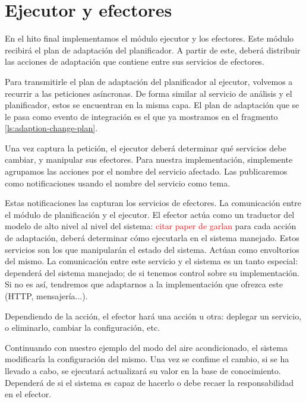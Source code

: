 \section{Ejecutor y efectores}

En el hito final implementamos el módulo ejecutor y los efectores. Este módulo recibirá el plan de adaptación del planificador. A partir de este, deberá distribuir las acciones de adaptación que contiene entre sus servicios de efectores.

Para transmitirle el plan de adaptación del planificador al ejecutor, volvemos a recurrir a las peticiones asíncronas. De forma similar al servicio de análisis y el planificador, estos se encuentran en la misma capa. El plan de adaptación que se le pasa como evento de integración es el que ya mostramos en el fragmento \ref{ls:adaption-change-plan}.

Una vez captura la petición, el ejecutor deberá determinar qué servicios debe cambiar, y manipular sus efectores. Para nuestra implementación, simplemente agrupamos las acciones por el nombre del servicio afectado. Las publicaremos como notificaciones usando el nombre del servicio como tema.

Estas notificaciones las capturan los servicios de efectores.
La comunicación entre el módulo de planificación  y el ejecutor. El efector actúa como un traductor del modelo de alto nivel al nivel del sistema: \textcolor{red}{citar paper de garlan} para cada acción de adaptación, deberá determinar cómo ejecutarla en el sistema manejado. Estos servicios son los que manipularán el estado del sistema. Actúan como envoltorios del mismo. La comunicación entre este servicio y el sistema es un tanto especial: dependerá del sistema manejado; de si tenemos control sobre su implementación. Si no es así, tendremos que adaptarnos a la implementación que ofrezca este (HTTP, mensajería...).

Dependiendo de la acción, el efector hará una acción u otra: deplegar un servicio, o eliminarlo, cambiar la configuración, etc.

Continuando con nuestro ejemplo del modo del aire acondicionado, el sistema modificaría la configuración del mismo. Una vez se confime el cambio, si se ha llevado a cabo, se ejecutará actualizará su valor en la base de conocimiento. Dependerá de si el sistema es capaz de hacerlo o debe recaer la responsabilidad en el efector.
